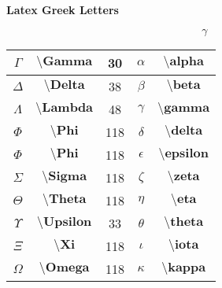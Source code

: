 \documentclass[10pt]{article}
\begin{document}
\begin{center}
\Large\textbf{Latex Greek Letters}
\end{center}
\[\gamma\]

\begin{tabular}{|c|c|c| c|c|}
\hline
$\Gamma$   & $\textbf{\textbackslash Gamma}$   &  30   & $\alpha$   & $\textbf{\textbackslash alpha}$   \\ \hline
$\Delta$   & $\textbf{\textbackslash Delta}$   &  38   & $\beta$    & $\textbf{\textbackslash beta}$    \\ \hline
$\Lambda$  & $\textbf{\textbackslash Lambda}$  &  48   & $\gamma$   & $\textbf{\textbackslash gamma}$   \\ \hline
$\Phi$     & $\textbf{\textbackslash Phi}$     &  118  & $\delta$   & $\textbf{\textbackslash delta}$   \\ \hline
$\Phi$     & $\textbf{\textbackslash Phi}$     &  118  & $\epsilon$ & $\textbf{\textbackslash epsilon}$ \\ \hline
$\Sigma$   & $\textbf{\textbackslash Sigma}$   &  118  & $\zeta$    & $\textbf{\textbackslash zeta}$    \\ \hline
$\Theta$   & $\textbf{\textbackslash Theta}$   &  118  & $\eta$     & $\textbf{\textbackslash eta}$     \\ \hline
$\Upsilon$ & $\textbf{\textbackslash Upsilon}$ &  33   & $\theta$   & $\textbf{\textbackslash theta}$   \\ \hline
$\Xi$      & $\textbf{\textbackslash Xi}$      &  118  & $\iota$    & $\textbf{\textbackslash iota}$    \\ \hline
$\Omega$   & $\textbf{\textbackslash Omega}$   &  118  & $\kappa$   & $\textbf{\textbackslash kappa}$   \\ \hline
\end{tabular}
\end{document}
